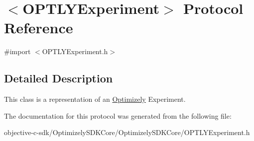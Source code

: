 \hypertarget{protocol_o_p_t_l_y_experiment-p}{}\section{$<$O\+P\+T\+L\+Y\+Experiment$>$ Protocol Reference}
\label{protocol_o_p_t_l_y_experiment-p}


{\ttfamily \#import $<$O\+P\+T\+L\+Y\+Experiment.\+h$>$}



\subsection{Detailed Description}
This class is a representation of an \mbox{\hyperlink{interface_optimizely}{Optimizely}} Experiment. 

The documentation for this protocol was generated from the following file\+:\begin{DoxyCompactItemize}
\item 
objective-\/c-\/sdk/\+Optimizely\+S\+D\+K\+Core/\+Optimizely\+S\+D\+K\+Core/O\+P\+T\+L\+Y\+Experiment.\+h\end{DoxyCompactItemize}
